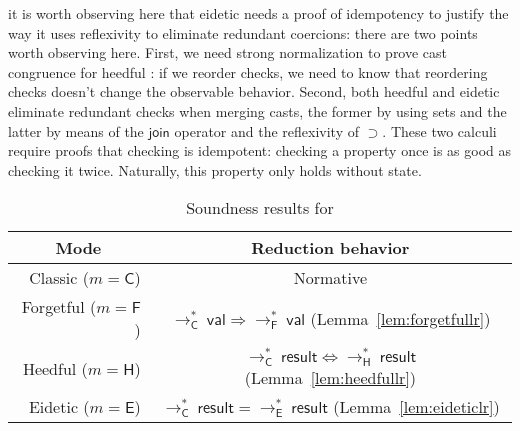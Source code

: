 \documentclass[9pt]{extarticle}
\newcommand{\ottnt}[1]{\mathit{#1}}
\newcommand{\ottsym}[1]{#1}
\begin{document}
\ifpopl it is worth observing here that eidetic \lambdah needs a
  proof of idempotency to justify the way it uses reflexivity to
  eliminate redundant coercions: \else there are
  two points worth observing here.
First, we need strong normalization to prove cast congruence for
heedful \lambdah: if we reorder checks, we need to know that
reordering checks doesn't change the observable behavior.
Second, both heedful and eidetic \lambdah eliminate redundant checks
when merging casts, the former by using sets and the latter by means
of the $ \mathsf{join} $ operator and the reflexivity of
$ \supset $. These two calculi require proofs that checking is
idempotent: \fi checking a property once is as good as checking it
twice. Naturally, this property only holds without state.

{\iffull
\begin{table}
\begin{tabular}{|r|c|c|}
  \hline
  \multicolumn{1}{|c|}{\textbf{Mode}} & \multicolumn{2}{|c|}{\textbf{Reduction behavior}} \\ 
  \hline
  Classic ($\ottnt{m}  \ottsym{=}   \mathsf{C} $)   & \multicolumn{2}{|c|}{Normative} \\ \hline
  Forgetful ($\ottnt{m}  \ottsym{=}   \mathsf{F} $) & \multicolumn{2}{|c|}{$\mathord{ \longrightarrow ^{*}_{  \mathsf{C}  } }~ \mathsf{val}  \Rightarrow \mathord{ \longrightarrow ^{*}_{  \mathsf{F}  } }~ \mathsf{val} $ (Lemma~\ref{lem:forgetfullr})} \\ \hline
  Heedful ($\ottnt{m}  \ottsym{=}   \mathsf{H} $)   & \multicolumn{2}{|c|}{$\mathord{ \longrightarrow ^{*}_{  \mathsf{C}  } }~ \mathsf{result}  \Leftrightarrow \mathord{ \longrightarrow ^{*}_{  \mathsf{H}  } }~ \mathsf{result} $ (Lemma~\ref{lem:heedfullr})} \\ \hline
  Eidetic ($\ottnt{m}  \ottsym{=}   \mathsf{E} $)   & \multicolumn{2}{|c|}{$\mathord{ \longrightarrow ^{*}_{  \mathsf{C}  } }~ \mathsf{result}  = \mathord{ \longrightarrow ^{*}_{  \mathsf{E}  } }~ \mathsf{result} $ (Lemma~\ref{lem:eideticlr})} \\ \hline 
\end{tabular}
\caption{Soundness results for \lambdah}
\label{tab:soundness}
\end{table}
\fi}
\end{document}
